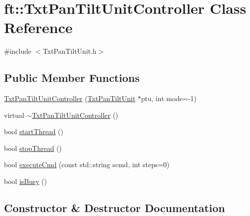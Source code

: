 \hypertarget{classft_1_1_txt_pan_tilt_unit_controller}{}\section{ft\+:\+:Txt\+Pan\+Tilt\+Unit\+Controller Class Reference}
\label{classft_1_1_txt_pan_tilt_unit_controller}


{\ttfamily \#include $<$Txt\+Pan\+Tilt\+Unit.\+h$>$}

\subsection*{Public Member Functions}
\begin{DoxyCompactItemize}
\item 
\hyperlink{classft_1_1_txt_pan_tilt_unit_controller_ab16d5b1d5b5ca961a2dba81067e8adb6}{Txt\+Pan\+Tilt\+Unit\+Controller} (\hyperlink{classft_1_1_txt_pan_tilt_unit}{Txt\+Pan\+Tilt\+Unit} $\ast$ptu, int mode=-\/1)
\item 
virtual \hyperlink{classft_1_1_txt_pan_tilt_unit_controller_a6f3059d7d90f93a52235891051123b71}{$\sim$\+Txt\+Pan\+Tilt\+Unit\+Controller} ()
\item 
bool \hyperlink{classft_1_1_txt_pan_tilt_unit_controller_a3141db7bcce440ea5caef83159351542}{start\+Thread} ()
\item 
bool \hyperlink{classft_1_1_txt_pan_tilt_unit_controller_a922fba7d43fd60748817616eeafdddd3}{stop\+Thread} ()
\item 
bool \hyperlink{classft_1_1_txt_pan_tilt_unit_controller_aa7fcd36cfb2eb3d4065a9b14b69854bf}{execute\+Cmd} (const std\+::string scmd, int steps=0)
\item 
bool \hyperlink{classft_1_1_txt_pan_tilt_unit_controller_abf97f25df2bf86f7e761e07084ceaa4b}{is\+Busy} ()
\end{DoxyCompactItemize}


\subsection{Constructor \& Destructor Documentation}
